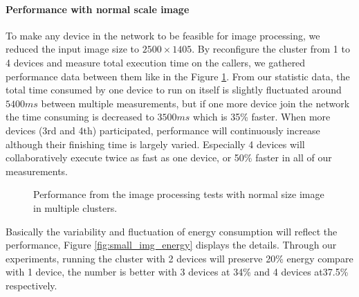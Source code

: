 \documentclass[conference]{IEEEtran}
\begin{document}
\paragraph{Performance with normal scale image}
To make any device in the network to be feasible for image processing, we reduced the input image size to $2500 \times 1405$. By reconfigure the cluster from 1 to 4 devices and measure total execution time on the callers, we gathered performance data between them like in the Figure \ref{fig:small_img_perf}. From our statistic data, the total time consumed by one device to run on itself is slightly fluctuated around $5400ms$ between multiple measurements, but if one more device join the network the time consuming is decreased to $3500ms$ which is 35\% faster. When more devices (3rd and 4th) participated, performance will continuously increase although their finishing time is largely varied. Especially 4 devices will collaboratively execute twice as fast as one device, or 50\% faster in all of our measurements.

\begin{figure}[H]
	\hspace*{0.25cm}
	\caption{Performance from the image processing tests with normal size image in multiple clusters.}
	\label{fig:small_img_perf}
\end{figure}

Basically the variability and fluctuation of energy consumption will reflect the performance, Figure \ref{fig:small_img_energy} displays the details. Through our experiments, running the cluster with 2 devices will preserve 20\% energy compare with 1 device, the number is better with 3 devices at 34\% and 4 devices at37.5\% respectively.
\end{document}
